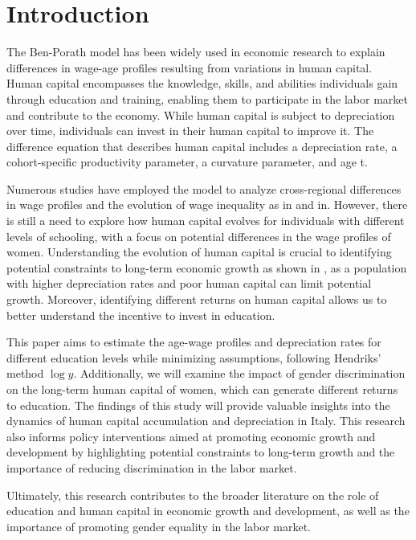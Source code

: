 \documentclass[12pt]{article}
\begin{document}
\section{Introduction}
The Ben-Porath model has been widely used in economic research to explain differences in wage-age profiles resulting
from variations in human capital. Human capital encompasses the knowledge, skills, and abilities individuals gain
through education and training, enabling them to participate in the labor market and contribute to the economy. While
human capital is subject to depreciation over time, individuals can invest in their human capital to improve it. The
difference equation that describes human capital includes a depreciation rate, a cohort-specific productivity parameter,
a curvature parameter, and age t.
\par
Numerous studies have employed the model\citet{ben1967production} to analyze cross-regional differences in wage profiles
\citet{baker1997human} and the evolution of wage inequality as in \citet{joshi2021gender} and in\citet{erosa2012human}.
However, there is still a need to explore how human capital evolves for individuals with different levels of
schooling, with a focus on potential differences in the wage profiles of women. Understanding the evolution of human
capital is crucial to identifying potential constraints to long-term economic growth as shown in \cite{mincer1981human},
as a population with higher depreciation rates and poor human capital can limit potential growth. Moreover, identifying
different returns on human capital allows us to better understand the incentive to invest in education.
\par
This paper aims to estimate the age-wage profiles and depreciation rates for different education levels while minimizing
assumptions, following Hendriks\cite{hendricks2013ben}' method $\log{y}$. Additionally, we will examine the impact of
gender discrimination on the long-term human capital of women, which can generate different returns to education. The
findings of this study will provide valuable insights into the dynamics of human capital accumulation and depreciation
in Italy. This research also informs policy interventions aimed at promoting economic growth and development by
highlighting potential constraints to long-term growth and the importance of reducing discrimination in the labor
market.
\par
Ultimately, this research contributes to the broader literature on the role of education and human capital in economic
growth and development, as well as the importance of promoting gender equality in the labor market.
\end{document}
